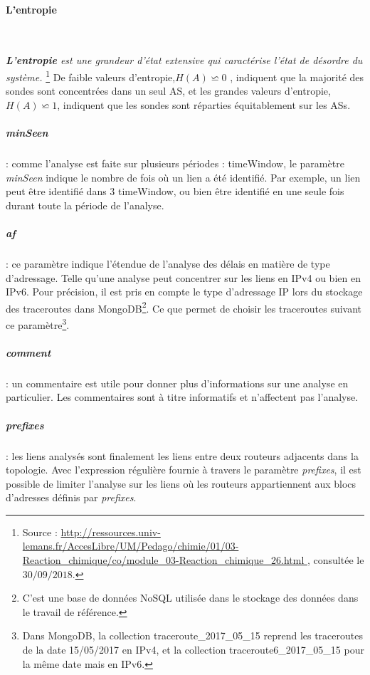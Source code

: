    \paragraph{L'entropie } \label{par:entrepie-sondes-par-as}~
   
\begin{tcolorbox}
\textit{\textbf{L'entropie} est une grandeur d'état extensive  qui caractérise l'état de désordre du système.} \footnote{Source : \url{ http://ressources.univ-lemans.fr/AccesLibre/UM/Pedago/chimie/01/03-Reaction_chimique/co/module_03-Reaction_chimique_26.html
   	}, consultée le $30/09/2018$.}
De faible valeurs d'entropie,$H(A) \backsimeq 0$ , indiquent que la majorité des sondes sont concentrées dans un seul AS, et les grandes valeurs d'entropie, $H(A) \backsimeq 1$, indiquent que les sondes sont réparties équitablement sur les ASs. 
\end{tcolorbox}
   


\subparagraph{minSeen} : comme l'analyse est faite sur plusieurs périodes : timeWindow, le paramètre \textit{minSeen} indique le nombre de fois où un lien a été identifié. Par exemple, un lien peut être identifié dans $3$ timeWindow, ou bien être identifié en une seule fois durant toute la période de l'analyse.

\subparagraph{af} : ce paramètre indique l'étendue de l'analyse des délais en matière de type d'adressage. Telle qu'une analyse peut concentrer sur les liens en IPv4 ou bien en IPv6. Pour précision, il est pris en compte  le type d'adressage IP lors du stockage des traceroutes dans MongoDB\footnote{C'est une base de données NoSQL utilisée dans le stockage des données dans le travail de référence.}. Ce que permet de choisir les traceroutes suivant ce paramètre\footnote{Dans MongoDB, la collection traceroute\_2017\_05\_15 reprend les traceroutes de la date 15/05/2017 en IPv4, et la collection traceroute6\_2017\_05\_15 pour la même date mais en IPv6.}. 

\subparagraph{comment} : un commentaire est utile pour donner plus d'informations sur une analyse en particulier. Les commentaires sont à titre informatifs et n'affectent pas l'analyse.

\subparagraph{prefixes} : les liens analysés sont finalement les liens entre deux routeurs adjacents dans la topologie. Avec l'expression régulière fournie à travers le paramètre \textit{prefixes}, il est possible de limiter l'analyse sur les liens où les routeurs appartiennent aux blocs d'adresses définis par \textit{prefixes}.  


